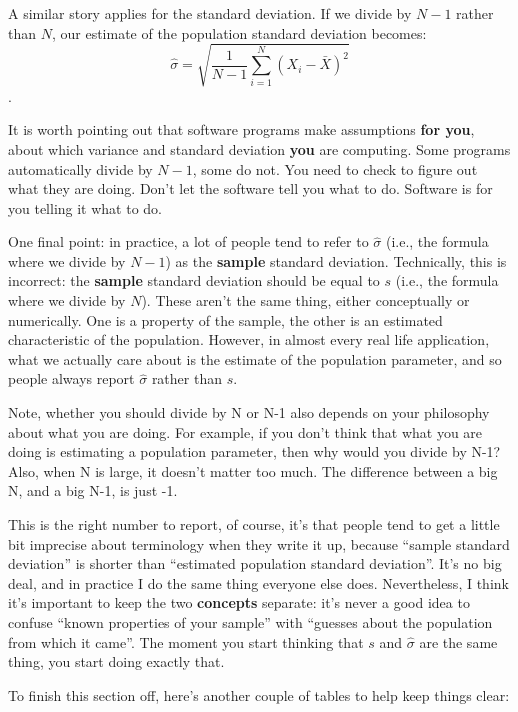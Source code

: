 \documentclass[
]{book}
\begin{document}
A similar story applies for the standard deviation. If we divide by \(N-1\) rather than \(N\), our estimate of the population standard deviation becomes: \[\hat\sigma = \sqrt{\frac{1}{N-1} \sum_{i=1}^N (X_i - \bar{X})^2}\].

It is worth pointing out that software programs make assumptions \textbf{for you}, about which variance and standard deviation \textbf{you} are computing. Some programs automatically divide by \(N-1\), some do not. You need to check to figure out what they are doing. Don't let the software tell you what to do. Software is for you telling it what to do.

One final point: in practice, a lot of people tend to refer to \(\hat{\sigma}\) (i.e., the formula where we divide by \(N-1\)) as the \textbf{sample} standard deviation. Technically, this is incorrect: the \textbf{sample} standard deviation should be equal to \(s\) (i.e., the formula where we divide by \(N\)). These aren't the same thing, either conceptually or numerically. One is a property of the sample, the other is an estimated characteristic of the population. However, in almost every real life application, what we actually care about is the estimate of the population parameter, and so people always report \(\hat\sigma\) rather than \(s\).

Note, whether you should divide by N or N-1 also depends on your philosophy about what you are doing. For example, if you don't think that what you are doing is estimating a population parameter, then why would you divide by N-1? Also, when N is large, it doesn't matter too much. The difference between a big N, and a big N-1, is just -1.

This is the right number to report, of course, it's that people tend to get a little bit imprecise about terminology when they write it up, because ``sample standard deviation'' is shorter than ``estimated population standard deviation''. It's no big deal, and in practice I do the same thing everyone else does. Nevertheless, I think it's important to keep the two \textbf{concepts} separate: it's never a good idea to confuse ``known properties of your sample'' with ``guesses about the population from which it came''. The moment you start thinking that \(s\) and \(\hat\sigma\) are the same thing, you start doing exactly that.

To finish this section off, here's another couple of tables to help keep things clear:
\end{document}

